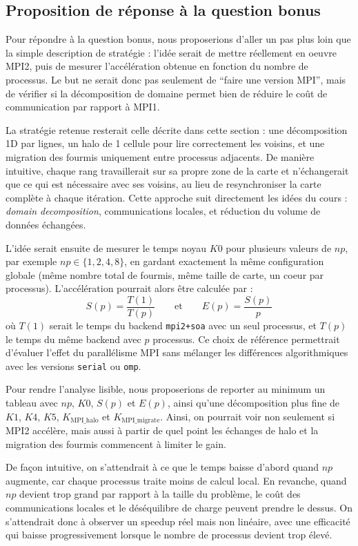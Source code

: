 \subsection{Proposition de réponse à la question bonus}

Pour répondre à la question bonus, nous proposerions d'aller un pas plus loin que la
simple description de stratégie : l'idée serait de mettre réellement en oeuvre MPI2,
puis de mesurer l'accélération obtenue en fonction du nombre de processus.
Le but ne serait donc pas seulement de ``faire une version MPI'', mais de vérifier si
la décomposition de domaine permet bien de réduire le coût de communication par rapport
à MPI1.

La stratégie retenue resterait celle décrite dans cette section :
une décomposition 1D par lignes, un halo de 1 cellule pour lire correctement les voisins,
et une migration des fourmis uniquement entre processus adjacents.
De manière intuitive, chaque rang travaillerait sur sa propre zone de la carte
et n'échangerait que ce qui est nécessaire avec ses voisins, au lieu de resynchroniser
la carte complète à chaque itération.
Cette approche suit directement les idées du cours :
\emph{domain decomposition}, communications locales, et réduction du volume de données échangées.

L'idée serait ensuite de mesurer le temps noyau \(K0\) pour plusieurs valeurs de \(np\),
par exemple \(np \in \{1,2,4,8\}\), en gardant exactement la même configuration globale
(même nombre total de fourmis, même taille de carte, un coeur par processus).
L'accélération pourrait alors être calculée par :
\[
S(p)=\frac{T(1)}{T(p)}
\qquad\text{et}\qquad
E(p)=\frac{S(p)}{p}
\]
où \(T(1)\) serait le temps du backend \texttt{mpi2+soa} avec un seul processus,
et \(T(p)\) le temps du même backend avec \(p\) processus.
Ce choix de référence permettrait d'évaluer l'effet du parallélisme MPI sans mélanger
les différences algorithmiques avec les versions \texttt{serial} ou \texttt{omp}.

Pour rendre l'analyse lisible, nous proposerions de reporter au minimum un tableau
avec \(np\), \(K0\), \(S(p)\) et \(E(p)\), ainsi qu'une décomposition plus fine
de \(K1\), \(K4\), \(K5\), \(K_{\text{MPI\_halo}}\) et \(K_{\text{MPI\_migrate}}\).
Ainsi, on pourrait voir non seulement si MPI2 accélère, mais aussi à partir de quel point
les échanges de halo et la migration des fourmis commencent à limiter le gain.

De façon intuitive, on s'attendrait à ce que le temps baisse d'abord quand \(np\) augmente,
car chaque processus traite moins de calcul local.
En revanche, quand \(np\) devient trop grand par rapport à la taille du problème,
le coût des communications locales et le déséquilibre de charge peuvent prendre le dessus.
On s'attendrait donc à observer un speedup réel mais non linéaire, avec une efficacité
qui baisse progressivement lorsque le nombre de processus devient trop élevé.

